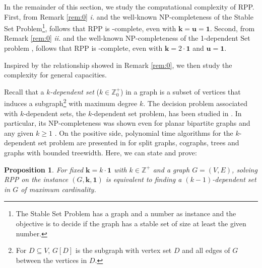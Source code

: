 \documentclass[preprint,12pt]{article}
\renewcommand{\geq}{\geqslant}
\newtheorem{proposition}[theorem]{Proposition}
\theoremstyle{definition}
\begin{document}
In the remainder of this section, we study the computational complexity of RPP. 
First, from Remark \ref{rem:0} \textit{i.} and the well-known NP-completeness of the Stable Set Problem\footnote{The Stable Set Problem has a graph and a number as instance and the objective is to decide if the graph has a stable set of size at least the given number.}, follows that 
    RPP is -complete, even with $\mathbf{k}=\mathbf{u}=\mathbf{1}$. Second, from Remark \ref{rem:0} \textit{ii.} and the well-known NP-completeness of the 1-dependent Set problem \cite{Betzler2012}, follows that
    RPP is -complete, even with $\mathbf{k}=2 \cdot \mathbf{1}$ and $\mathbf{u}=\mathbf{1}$.
    

Inspired by the relationship showed in  Remark \ref{rem:0}, we then study the complexity for general capacities. 

Recall that a \emph{$k$-dependent set} ($k\in \mathbb{Z}_0^+$)  in a graph is a subset of vertices that induces a subgraph\footnote{For $D\subseteq V$, $G[D]$ is the subgraph with vertex set $D$ and all edges of $G$ between the vertices in $D$.}  with maximum degree $k$. 
 The decision problem associated with $k$-dependent sets, the $k$-dependent set problem, has been studied in \cite{Djidjev1992}. In particular, its NP-completeness was shown
even for planar bipartite
graphs and any given $k \geq 1$ \cite{Dessmark1993}. On the positive side,  polynomial time algorithms for the $k$-dependent set problem are presented in \cite{Dessmark1993} for split graphs, cographs, trees and graphs with bounded treewidth. Here, we can state and prove:



\begin{proposition}\label{prop:bounded} 
For  fixed  $\mathbf{k}=k\cdot \mathbf{1}$ with $ k \in \mathbb{Z}^+$   and a graph $G=(V,E)$,
    solving RPP on the instance  $(G, \mathbf{k}, \mathbf{1})$ is equivalent to finding a $(k-1)$-dependent set in $G$  of maximum cardinality.
\end{proposition}
\end{document}
